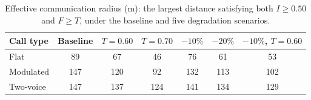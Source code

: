 \begin{table}[!ht]
\centering
\caption{Effective communication radius (m): the largest distance satisfying both $I\ge0.50$ and $F\ge T$, under the baseline and five degradation scenarios.}
\label{tab:p4radius}
\small
\begin{tabular}{lcccccc}
\toprule
Call type & Baseline & $T=0.60$ & $T=0.70$ & $-10\%$ & $-20\%$ & $-10\%$, $T=0.60$ \\
\midrule
Flat & 89 & 67 & 46 & 76 & 61 & 53 \\
Modulated & 147 & 120 & 92 & 132 & 113 & 102 \\
Two-voice & 147 & 137 & 124 & 141 & 134 & 129 \\
\bottomrule
\end{tabular}
\end{table}